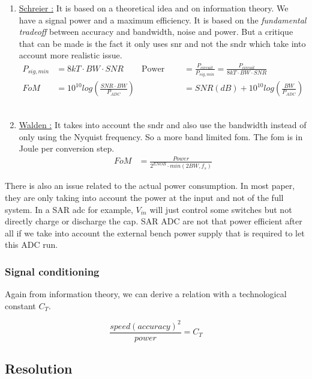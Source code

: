 \documentclass{report}
\begin{document}
\begin{enumerate}
    \item \underline{Schreier :} It is based on a theoretical idea and on information theory. We have a signal power and a maximum efficiency. It is based on the \textit{fundamental tradeoff} between accuracy and bandwidth, noise and power. But a critique that can be made is the fact it only uses \gls{snr} and not the \gls{sndr} which take into account more realistic issue. 
    \begin{align}
    P_{sig,min} &= 8kT \cdot BW \cdot SNR & \text{Power efficiency} &= \frac{P_{circuit}}{P_{sig,min}} = \frac{P_{circuit}}{8kT \cdot BW \cdot SNR}\\
    FoM &= 10^{10} log\left( \frac{SNR\cdot BW}{P_{ADC}} \right) & &=SNR (dB) + 10^{10} log\left( \frac{BW}{P_{ADC}} \right)
    \end{align}\\
    \item \underline{Walden :} It takes into account the \gls{sndr} and also use the bandwidth instead of only using the Nyquist frequency. So a more band limited \gls{fom}. The \gls{fom} is in Joule per conversion step.
    \begin{align}
        FoM &= \frac{Power}{2^{ENOB} \cdot min(2BW,f_s)}
    \end{align}
\end{enumerate}

There is also an issue related to the actual power consumption. In most paper, they are only taking into account the power at the input and not of the full system. In a SAR \gls{adc} for example, $V_{in}$ will just control some switches but not directly charge or discharge the cap. SAR ADC are not that power efficient after all if we take into account the external bench power supply that is required to let this ADC run.

\subsubsection{Signal conditioning}

Again from information theory, we can derive a relation with a technological constant $C_T$.

\begin{equation}
    \frac{speed (accuracy)^2}{power} = C_T
\end{equation}

\subsection{Resolution}
\end{document}
